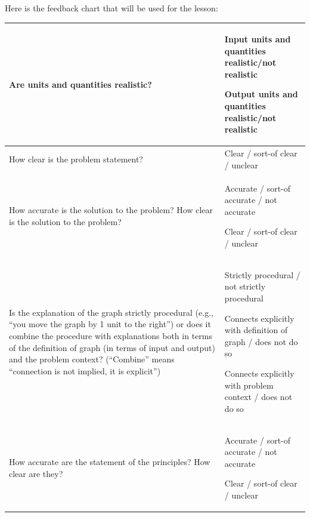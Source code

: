 \documentclass[11pt]{article}
\theoremstyle{definition}
\begin{document}
Here is the feedback chart that will be used for the lesson:

\hspace*{-0.25in}\begin{tabular}{L{2.3in}|L{4.5in}}
\hline 
Are units and quantities realistic? 
	& 
	Input units and quantities realistic/not realistic
	
	Output units and quantities realistic/not realistic
\\ 
\hline
How clear is the problem statement?
	& 
	Clear / sort-of clear / unclear 
\\ 
\hline
How accurate is the solution to the problem? How clear is the solution to the problem?
	& 
	Accurate / sort-of accurate / not accurate  
	
	Clear / sort-of clear / unclear 
\\ 
\hline
Is the explanation of the graph strictly procedural (e.g., ``you move the graph by 1 unit to the right'') or does it combine the procedure with explanations both in terms of the definition of graph (in terms of input and output) and the problem context? (``Combine'' means ``connection is not implied, it is explicit'')
	&
	Strictly procedural / not strictly procedural 
	
	Connects explicitly with definition of graph / does not do so 
	
	Connects explicitly with problem context  / does not do so \\
\hline
How accurate are the statement of the principles? How clear are they? 
	& Accurate / sort-of accurate / not accurate  
	
	Clear / sort-of clear / unclear  \\ 
\hline
\end{tabular}
\end{document}

